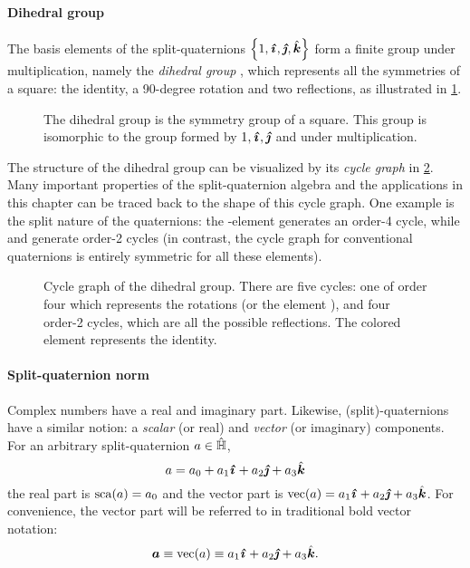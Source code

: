 \paragraph{Dihedral group} The basis elements of the split-quaternions $\qty{1, \quati, \quatj, \quatk}$ form a finite group under multiplication, namely the \emph{dihedral group} , which represents all the symmetries of a square: the identity, a 90-degree rotation and two reflections, as illustrated in \cref{fig:square_symmetry}. \cite{Dummit2004}
\begin{figure}[ht!]
    \centering
    
    \caption{The dihedral group  is the symmetry group of a square. This group is isomorphic to the group formed by $1, \quati, \quatj$ and \quatk under multiplication.}
    \label{fig:square_symmetry}
\end{figure}

The structure of the dihedral group can be visualized by its \emph{cycle graph} in \cref{fig:cycle_graph}. Many important properties of the split-quaternion algebra and the applications in this chapter can be traced back to the shape of this cycle graph. One example is the split nature of the quaternions: the \quati-element generates an order-4 cycle, while \quatj and \quatk generate order-2 cycles (in contrast, the cycle graph for conventional quaternions is entirely symmetric for all these elements). \cite{Dummit2004}
\begin{figure}[h!]
    \centering
    
    \caption{Cycle graph of the dihedral group. There are five cycles: one of order four which represents the rotations (or the element \quati), and four order-2 cycles, which are all the possible reflections. The colored element represents the identity.}
    \label{fig:cycle_graph}
\end{figure}

\paragraph{Split-quaternion norm} Complex numbers have a real and imaginary part. Likewise, (split)-quaternions have a similar notion: a \emph{scalar} (or real) and \emph{vector} (or imaginary) components. For an arbitrary split-quaternion $a \in \hat{\mathbb{H}}$, \cite{Jafari2014}
$$ a = \quat{a_0}{a_1}{a_2}{a_3} $$
the real part is $\mathrm{sca}\qty(a) = a_0$ and the vector part is $ \vecpart{a} = \quatvec{a_1}{a_2}{a_3}$. For convenience, the vector part will be referred to in traditional bold vector notation:
$$ \vec{a} \equiv \vecpart{a} \equiv \quatvec{a_1}{a_2}{a_3}. $$


